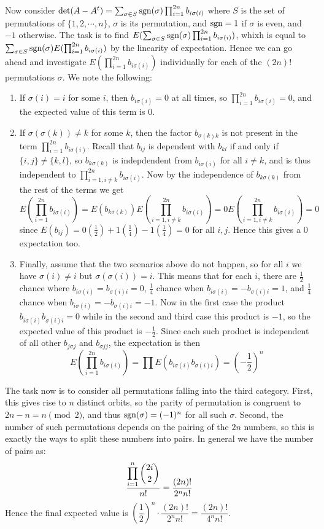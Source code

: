 \documentclass[11pt,a4paper]{article}
\newcommand{\<}{\langle}
\renewcommand{\>}{\rangle}
\begin{document}
\begin{enumerate}
	Now consider $\det(A-A^t)=\sum_{\sigma\in S}\text{sgn}(\sigma)\prod_{i=1}^{2n}b_{i\sigma(i)}$ where $S$ is the set of permutations of $\{1, 2, \cdots , n\}$, $\sigma$ is its permutation, and $\text{sgn}=1$ if $\sigma$ is even, and $-1$ otherwise. The task is to find $E(\sum_{\sigma\in S}\text{sgn}(\sigma)\prod_{i=1}^{2n}b_{i\sigma(i)})$, whixh is equal to $\sum_{\sigma\in S}\text{sgn}(\sigma)E(\prod_{i=1}^{2n}b_{i\sigma(i)})$ by the linearity of expectation. Hence we can go ahead and investigate $E(\prod_{i=1}^{2n}b_{i\sigma(i)})$ individually for each of the $(2n)!$ permutations $\sigma$. We note the following: 
	\begin{enumerate}
		\item If $\sigma(i)=i$ for some $i$, then $b_{i\sigma(i)}=0$ at all times, so $\prod_{i=1}^{2n}b_{i\sigma(i)}=0$, and the expected value of this term is 0. 
		\item If $\sigma(\sigma(k))\neq k$ for some $k$, then the factor $b_{\sigma(k)k}$ is not present in the term $\prod_{i=1}^{2n}b_{i\sigma(i)}$. Recall that $b_{ij}$ is dependent with $b_{kl}$ if and only if $\{i, j\}\neq \{k, l\}$, so $b_{k\sigma(k)}$ is indepdendent from $b_{i\sigma(i)}$ for all $i\neq k$, and is thus independent to $\prod_{i=1, i\neq k}^{2n}b_{i\sigma(i)}$. 
		Now by the independence of $b_{k\sigma(k)}$ from the rest of the terms we get 
		\[E(\prod_{i=1}^{2n}b_{i\sigma(i)})=E(b_{k\sigma(k)})E(\prod_{i=1, i\neq k}^{2n}b_{i\sigma(i)})
		=0E(\prod_{i=1, i\neq k}^{2n}b_{i\sigma(i)})=0\]
		since $E(b_{ij})=0(\frac 12)+1(\frac 14)-1(\frac 14)=0$ for all $i, j$. Hence this gives a 0 expectation too. 
		\item Finally, assume that the two scenarios above do not happen, so for all $i$ we have $\sigma(i)\neq i$ but $\sigma(\sigma(i))=i$. This means that for each $i$, there are $\frac 12$ chance where $b_{i\sigma(i)}=b_{\sigma(i)i}=0$, $\frac 14$ chance when $b_{i\sigma(i)}=-b_{\sigma(i)i}=1$, and $\frac 14$ chance when $b_{i\sigma(i)}=-b_{\sigma(i){i}}=-1$. Now in the first case the product $b_{i\sigma(i)}b_{\sigma(i)i}=0$ while in the second and third case this product is $-1$, so the expected value of this product is $-\frac 12$. Since each such product is independent of all other $b_{j\sigma{j}}$ and $b_{\sigma{j}j}$, the expectation is then 
		\[E(\prod_{i=1}^{2n}b_{i\sigma(i)})=\prod E(b_{i\sigma(i)}b_{\sigma(i)i})=\left(-\frac 12\right)^n\]
	\end{enumerate}
	The task now is to consider all permutations falling into the third category. First, this gives rise to $n$ distinct orbits, so the parity of permutation is congruent to $2n-n=n\pmod{2}$, and thus $\text{sgn}(\sigma)=(-1)^n$ for all such $\sigma$. Second, the number of such permutations depends on the pairing of the $2n$ numbers, so this is exactly the ways to split these numbers into pairs. In general we have the number of pairs as: 
	\[\frac{\displaystyle\prod_{i=1}^n\dbinom{2i}{2}}{n!}=\dfrac{(2n)!}{2^n n!}\]
	Hence the final expected value is $(\dfrac 12)^n \cdot \dfrac{(2n)!}{2^n n!}=\dfrac{(2n)!}{4^n n!}$. 
	

\end{enumerate}
\end{document}
